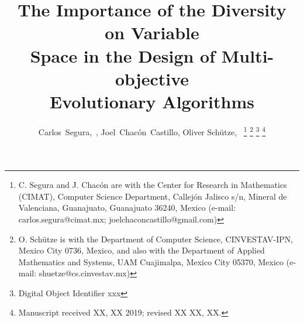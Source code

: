 \documentclass[journal]{IEEEtran}
\begin{document}
%
\title{The Importance of the Diversity on Variable \\ Space in the Design of Multi-objective \\Evolutionary Algorithms}
%
%
%

\author{Carlos~Segura,~, Joel~Chac\'on~Castillo, Oliver Sch\"{u}tze,~
\thanks{C. Segura and J. Chac\'on are with the Center for Research in Mathematics (CIMAT), Computer Science Department,
Callej\'on Jalisco s/n, Mineral de Valenciana, Guanajuato, Guanajuato 36240, Mexico (e-mail: carlos.segura@cimat.mx; joelchaconcastillo@gmail.com)}%
\thanks{O. Sch\"utze is with the Department of Computer Science, CINVESTAV-IPN, Mexico City 0736, Mexico, and also with the Department of Applied Mathematics and Systems, UAM Cuajimalpa, Mexico City 05370, Mexico (e-mail: shuetze@cs.cinvestav.mx)}
\thanks{Digital Object Identifier xxx}
\thanks{Manuscript received XX, XX 2019; revised XX XX, XX.}%
}



\end{document}

